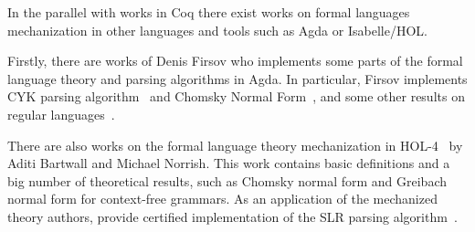In the parallel with works in Coq there exist works on formal languages mechanization in other languages and tools such as Agda or Isabelle/HOL.

Firstly, there are works of Denis Firsov who implements some parts of the formal language theory and parsing algorithms in Agda.
In particular, Firsov implements CYK parsing algorithm~\cite{firsov2014certified,firsov2016cfl} and Chomsky Normal Form~\cite{firsov2015certified}, and some other results on regular languages~\cite{10.1007/978-3-319-03545-1_7}.

There are also works on the formal language theory mechanization in HOL-4~\cite{1885-16399,barthwal2010formalisation,10.1007/978-3-642-13824-9_11} by Aditi Bartwall and Michael Norrish.
This work contains basic definitions and a big number of theoretical results, such as Chomsky normal form and Greibach normal form for context-free grammars. 
As an application of the mechanized theory authors, provide certified implementation of the SLR parsing algorithm~\cite{10.1007/978-3-642-00590-9_12}.




